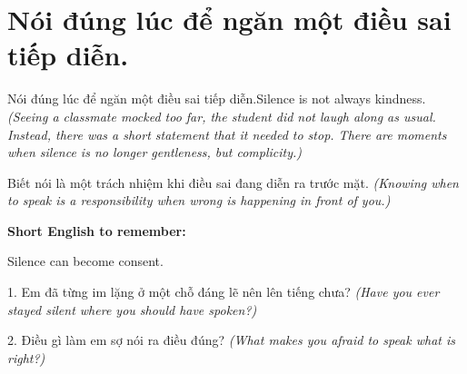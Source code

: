 \section{Nói đúng lúc để ngăn một điều sai tiếp diễn.}
\begin{truyen}{Nói đúng lúc để ngăn một điều sai tiếp diễn.}{Silence is not always kindness.}
\textit{(Seeing a classmate mocked too far, the student did not laugh along as usual. Instead, there was a short statement that it needed to stop. There are moments when silence is no longer gentleness, but complicity.)}
\end{truyen}
\begin{baihoc}
Biết nói là một trách nhiệm khi điều sai đang diễn ra trước mặt.
\textit{(Knowing when to speak is a responsibility when wrong is happening in front of you.)}
\end{baihoc}
\begin{ghinhoanh}
\textbf{Short English to remember:}

Silence can become consent.
\end{ghinhoanh}
\begin{tuhocnhanh}
1. Em đã từng im lặng ở một chỗ đáng lẽ nên lên tiếng chưa? \textit{(Have you ever stayed silent where you should have spoken?)}

2. Điều gì làm em sợ nói ra điều đúng? \textit{(What makes you afraid to speak what is right?)}
\end{tuhocnhanh}
\ngancach

